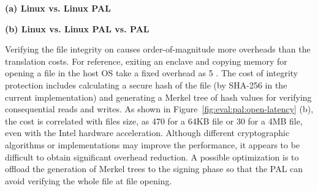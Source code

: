 \begin{figure*}[t!]
\centering
\footnotesize
{}
\parbox{0.49\textwidth}{\centering\bf (a) Linux vs. Linux PAL}
\parbox{0.49\textwidth}{\centering\bf (b) Linux vs. Linux PAL vs. \sgx{} PAL}
\caption{Latency of  on the Linux PAL  and \sgx{} PAL, versus  on Linux.
Lower is better.
Figure (a) compares  on the Linux PAL,
with and without a \seccomp{} filter ({\bf +SC})
and reference monitor ({\bf +RM}), against  on Linux. Figure (b) compares  on a \sgx{} PAL,
with and without integrity checks ({\bf +CHK}),
against the Linux PAL and  on Linux.}
\label{fig:eval:pal:open-latency}
\end{figure*}


Verifying the file integrity on \sgx{}
causes order-of-magnitude more overheads than the translation costs.
For reference,
exiting an enclave and copying memory for opening a file in the host OS take a fixed overhead
as \roughly{}5 \usec{}.
The cost of integrity protection
includes
calculating a secure hash of the file (by SHA-256 in the current implementation)
and generating a Merkel tree of hash values
for verifying
consequential reads and writes.
As shown in Figure~\ref{fig:eval:pal:open-latency} (b),
the cost is correlated with files size,
as \roughly{}470\usec{} for a 64KB file or \roughly{}30 \msec{} for a 4MB file,
even with the Intel hardware acceleration.
Although different cryptographic algorithms or implementations
may improve the performance,
it appears to be difficult to obtain significant overhead reduction.
A possible optimization
is to offload the generation of Merkel trees to the signing phase so that the PAL can avoid verifying the whole file at file opening.





